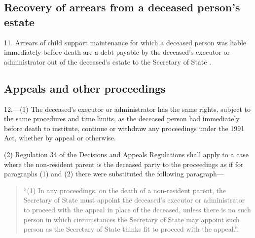 \documentclass[12pt,a4paper]{article}
\begin{document}
\subsection[11. Recovery of arrears from a deceased person’s estate]{Recovery of arrears from a deceased person’s estate}

11.  Arrears of child support maintenance for which a deceased person was liable immediately before death are a debt payable by the deceased’s executor or administrator out of the deceased’s estate to the 
Secretary of State%
.


\subsection[12. Appeals and other proceedings]{Appeals and other proceedings}

12.---(1)  The deceased’s executor or administrator has the same rights, subject to the same procedures and time limits, as the deceased person had immediately before death to institute, continue or withdraw any proceedings under the 1991 Act, whether by appeal or otherwise.

(2) Regulation 34 of the Decisions and Appeals Regulations shall apply to a case where the non-resident parent is the deceased party to the proceedings as if for paragraphs (1) and (2) there were substituted the following paragraph—
\begin{quotation}
“(1) In any proceedings, on the death of a non-resident parent, the 
Secretary of State  %
must appoint the deceased’s executor or administrator to proceed with the appeal in place of the deceased, unless there is no such person in which circumstances 
the Secretary of State  %
may appoint such person as 
the Secretary of State  %
thinks fit to proceed with the appeal.”.
\end{quotation}

\end{document}
